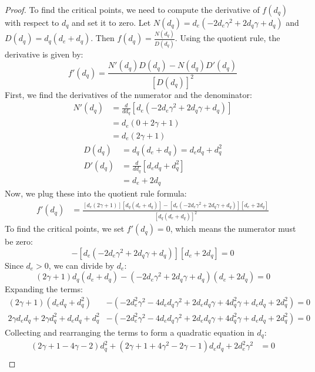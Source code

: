 \begin{proof}
To find the critical points, we need to compute the derivative of $f(d_q)$ with respect to $d_q$ and set it to zero. Let $N(d_q) = d_e (-2d_e \gamma^2 + 2d_q \gamma + d_q)$ and $D(d_q) = d_q (d_e + d_q)$. Then $f(d_q) = \frac{N(d_q)}{D(d_q)}$. Using the quotient rule, the derivative is given by:
\begin{equation*}
f'(d_q) = \frac{N'(d_q)D(d_q) - N(d_q)D'(d_q)}{[D(d_q)]^2}
\end{equation*}
First, we find the derivatives of the numerator and the denominator:
\begin{align*}
N'(d_q) &= \frac{d}{dd_q} [d_e (-2d_e \gamma^2 + 2d_q \gamma + d_q)] \\
&= d_e (0 + 2\gamma + 1) \\
&= d_e (2\gamma + 1)
\end{align*}
\begin{align*}
D(d_q) &= d_q (d_e + d_q) = d_e d_q + d_q^2 \\
D'(d_q) &= \frac{d}{dd_q} [d_e d_q + d_q^2] \\
&= d_e + 2d_q
\end{align*}
Now, we plug these into the quotient rule formula:
\begin{align*}
f'(d_q) &= \frac{[d_e (2\gamma + 1)][d_q (d_e + d_q)] - [d_e (-2d_e \gamma^2 + 2d_q \gamma + d_q)][d_e + 2d_q]}{[d_q (d_e + d_q)]^2}
\end{align*}
To find the critical points, we set $f'(d_q) = 0$, which means the numerator must be zero:
\begin{equation*}
[d_e (2\gamma + 1)][d_q (d_e + d_q)] - [d_e (-2d_e \gamma^2 + 2d_q \gamma + d_q)][d_e + 2d_q] = 0
\end{equation*}
Since $d_e > 0$, we can divide by $d_e$:
\begin{equation*}
(2\gamma + 1) d_q (d_e + d_q) - (-2d_e \gamma^2 + 2d_q \gamma + d_q) (d_e + 2d_q) = 0
\end{equation*}
Expanding the terms:
\begin{align*}
(2\gamma + 1) (d_e d_q + d_q^2) &- (-2d_e^2 \gamma^2 - 4d_e d_q \gamma^2 + 2d_e d_q \gamma + 4d_q^2 \gamma + d_e d_q + 2d_q^2) = 0 \\
2\gamma d_e d_q + 2\gamma d_q^2 + d_e d_q + d_q^2 &- (-2d_e^2 \gamma^2 - 4d_e d_q \gamma^2 + 2d_e d_q \gamma + 4d_q^2 \gamma + d_e d_q + 2d_q^2) = 0
\end{align*}
Collecting and rearranging the terms to form a quadratic equation in $d_q$:
\begin{align*}
(2\gamma + 1 - 4\gamma - 2) d_q^2 + (2\gamma + 1 + 4\gamma^2 - 2\gamma - 1) d_e d_q + 2d_e^2 \gamma^2 &= 0 \\

\end{align*}
\end{proof}
